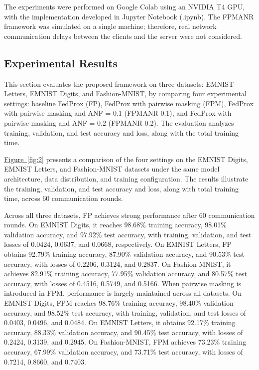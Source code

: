 \documentclass[a4paper,fleqn]{cas-dc}
\newcommand{\xfig}[1]{\hyperref[#1]{Figure~\ref*{#1}}}
\begin{document}
The experiments were performed on Google Colab using an NVIDIA T4 GPU, with the implementation developed in Jupyter Notebook (.ipynb). The FPMANR framework was simulated on a single machine; therefore, real network communication delays between the clients and the server were not considered.

\subsection{Experimental Results}

This section evaluates the proposed framework on three datasets: EMNIST Letters, EMNIST Digits, and Fashion-MNIST, by comparing four experimental settings: baseline FedProx (FP), FedProx with pairwise masking (FPM), FedProx with pairwise masking and ANF = 0.1 (FPMANR 0.1), and FedProx with pairwise masking and ANF = 0.2 (FPMANR 0.2). The evaluation analyzes training, validation, and test accuracy and loss, along with the total training time.

\xfig{fig:2} presents a comparison of the four settings on the EMNIST Digits, EMNIST Letters, and Fashion-MNIST datasets under the same model architecture, data distribution, and training configuration. The results illustrate the training, validation, and test accuracy and loss, along with total training time, across 60 communication rounds.

Across all three datasets, FP achieves strong performance after 60 communication rounds. On EMNIST Digits, it reaches 98.68\% training accuracy, 98.01\% validation accuracy, and 97.92\% test accuracy, with training, validation, and test losses of 0.0424, 0.0637, and 0.0668, respectively. On EMNIST Letters, FP obtains 92.79\% training accuracy, 87.90\% validation accuracy, and 90.53\% test accuracy, with losses of 0.2206, 0.3124, and 0.2837. On Fashion-MNIST, it achieves 82.91\% training accuracy, 77.95\% validation accuracy, and 80.57\% test accuracy, with losses of 0.4516, 0.5749, and 0.5166. When pairwise masking is introduced in FPM, performance is largely maintained across all datasets. On EMNIST Digits, FPM reaches 98.76\% training accuracy, 98.40\% validation accuracy, and 98.52\% test accuracy, with training, validation, and test losses of 0.0403, 0.0496, and 0.0484. On EMNIST Letters, it obtains 92.17\% training accuracy, 88.33\% validation accuracy, and 90.45\% test accuracy, with losses of 0.2424, 0.3139, and 0.2945. On Fashion-MNIST, FPM achieves 73.23\% training accuracy, 67.99\% validation accuracy, and 73.71\% test accuracy, with losses of 0.7214, 0.8660, and 0.7403.
\end{document}
